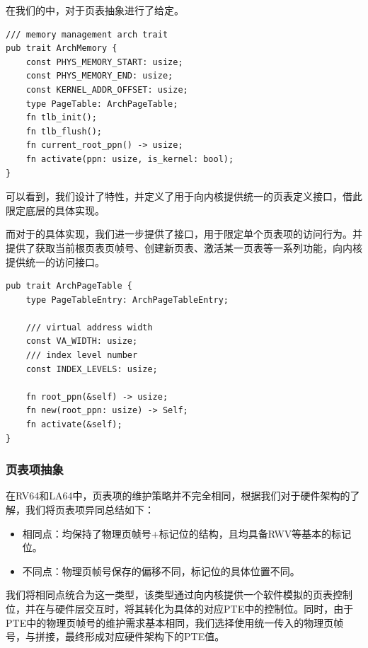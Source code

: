 \documentclass{article}
\begin{document}
在我们的中，对于页表抽象进行了给定。

\begin{lstlisting}
/// memory management arch trait
pub trait ArchMemory {
    const PHYS_MEMORY_START: usize;
    const PHYS_MEMORY_END: usize;
    const KERNEL_ADDR_OFFSET: usize;
    type PageTable: ArchPageTable;
    fn tlb_init();
    fn tlb_flush();
    fn current_root_ppn() -> usize;
    fn activate(ppn: usize, is_kernel: bool);
}
\end{lstlisting}

可以看到，我们设计了特性，并定义了用于向内核提供统一的页表定义接口，借此限定底层的具体实现。

而对于的具体实现，我们进一步提供了接口，用于限定单个页表项的访问行为。并提供了获取当前根页表页帧号、创建新页表、激活某一页表等一系列功能，向内核提供统一的访问接口。

\begin{lstlisting}
pub trait ArchPageTable {
    type PageTableEntry: ArchPageTableEntry;

    /// virtual address width
    const VA_WIDTH: usize;
    /// index level number
    const INDEX_LEVELS: usize;

    fn root_ppn(&self) -> usize;
    fn new(root_ppn: usize) -> Self;
    fn activate(&self);
}
\end{lstlisting}

\subsubsection{页表项抽象}

在RV64和LA64中，页表项的维护策略并不完全相同，根据我们对于硬件架构的了解，我们将页表项异同总结如下：

\begin{itemize}
    \item 相同点：均保持了物理页帧号+标记位的结构，且均具备RWV等基本的标记位。
    \item 不同点：物理页帧号保存的偏移不同，标记位的具体位置不同。
\end{itemize}

我们将相同点统合为这一类型，该类型通过向内核提供一个软件模拟的页表控制位，并在与硬件层交互时，将其转化为具体的对应PTE中的控制位。同时，由于PTE中的物理页帧号的维护需求基本相同，我们选择使用统一传入的物理页帧号，与拼接，最终形成对应硬件架构下的PTE值。
\end{document}
